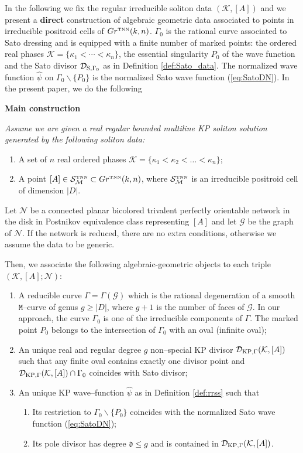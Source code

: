 \documentclass[11pt]{amsart}
\theoremstyle{plain}
\numberwithin{equation}{section}
\def \GTNN {{Gr^{\mbox{\tiny TNN}} (k,n)}}
\def \DKP {{\mathcal D}_{\textup{\scriptsize KP},\Gamma}}
\def \DS {{\mathcal D}_{\textup{\scriptsize S},\Gamma_0}}
\def \S {{\mathcal S}_{\mathcal M}^{\mbox{\tiny TNN}}}
\begin{document}
In the following we fix the regular irreducible soliton data $({\mathcal K}, [A])$ and we present a \textbf{direct} construction of algebraic geometric data associated to points in irreducible positroid cells of $\GTNN$.
$\Gamma_0$ is the rational curve associated to Sato dressing and is equipped with a finite number of marked points: the ordered real phases ${\mathcal K} = \{ \kappa_1<\cdots<\kappa_n\}$, the essential singularity 
$P_0$ of the wave function and the Sato divisor $\DS$ as in Definition \ref{def:Sato_data}. The normalized wave function $\hat \psi$ on $\Gamma_0 \backslash \{ P_0\}$ is the normalized Sato wave function (\ref{eq:SatoDN}).
In the present paper, we do the following 

\textbf{Main construction} {\sl Assume we are given a real regular bounded multiline KP soliton solution generated by the following soliton data:
\begin{enumerate}
\item A set of $n$ real ordered phases ${\mathcal K} =\{ \kappa_1<\kappa_2<\dots<\kappa_n\}$;
\item A point $[A]\in \S \subset \GTNN$, where $\S$ is an irreducible positroid cell of dimension $|D|$. 
\end{enumerate}
Let ${\mathcal N}$ be a connected planar bicolored trivalent perfectly orientable network in the disk in Postnikov equivalence class representing $[A]$ and let ${\mathcal G}$ be the graph of ${\mathcal N}$. If the network is reduced, there are no extra conditions, otherwise we assume the data to be generic.

Then, we associate the following algebraic-geometric objects to each triple $({\mathcal K}, [A]; {\mathcal N})$:
\begin{enumerate}
\item A reducible curve $\Gamma=\Gamma(\mathcal G)$ which is the rational degeneration of a smooth $\mathtt M$--curve of genus $g\ge |D|$, where $g+1$ is the number of faces of $\mathcal G$. In our approach, the curve $\Gamma_0$ is one of the irreducible components of $\Gamma$. The marked point $P_0$ belongs to the intersection of $\Gamma_0$ with an oval (infinite oval); 
\item An unique real and regular degree $g$ non--special KP divisor $\DKP({\mathcal K}, [A])$ such that any finite oval contains exactly one divisor point and $\DKP ({\mathcal K}, [A])\cap \Gamma_0$ coincides with Sato divisor;
\item An unique KP wave--function $\hat \psi$ as in Definition \ref{def:rrss} such that
\begin{enumerate}
\item Its restriction to $\Gamma_0\backslash \{P_0\}$ coincides with the normalized Sato wave function (\ref{eq:SatoDN});
\item Its pole divisor has degree $\mathfrak d \le g$ and is contained in $\DKP ({\mathcal K}, [A])$.
\end{enumerate}
\end{enumerate}
}
\end{document}

